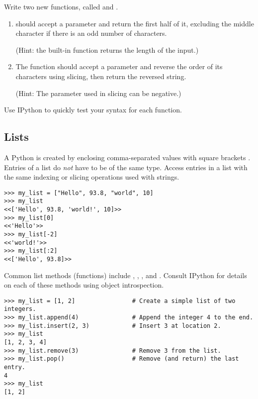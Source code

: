 \begin{problem} %
Write two new functions, called  and .
\begin{enumerate}
\item {} should accept a parameter and return the first half of it, excluding the middle character if there is an odd number of characters.

(Hint: the built-in function  returns the length of the input.)
\item The  function should accept a parameter and reverse the order of its characters using slicing, then return the reversed string.

(Hint: The  parameter used in slicing can be negative.)
\end{enumerate}
Use IPython to quickly test your syntax for each function.
\end{problem}

\subsection*{Lists} %

A Python  is created by enclosing comma-separated values with square brackets \li{[ ]}.
Entries of a list do \emph{not} have to be of the same type.
Access entries in a list with the same indexing or slicing operations used with strings.

\begin{lstlisting}
>>> my_list = ["Hello", 93.8, "world", 10]
>>> my_list
<<['Hello', 93.8, 'world!', 10]>>
>>> my_list[0]
<<'Hello'>>
>>> my_list[-2]
<<'world!'>>
>>> my_list[:2]
<<['Hello', 93.8]>>
\end{lstlisting}

Common list methods (functions) include , , , and .
Consult IPython for details on each of these methods using object introspection.
\begin{lstlisting}
>>> my_list = [1, 2]                # Create a simple list of two integers.
>>> my_list.append(4)               # Append the integer 4 to the end.
>>> my_list.insert(2, 3)            # Insert 3 at location 2.
>>> my_list
[1, 2, 3, 4]
>>> my_list.remove(3)               # Remove 3 from the list.
>>> my_list.pop()                   # Remove (and return) the last entry.
4
>>> my_list
[1, 2]
\end{lstlisting}

